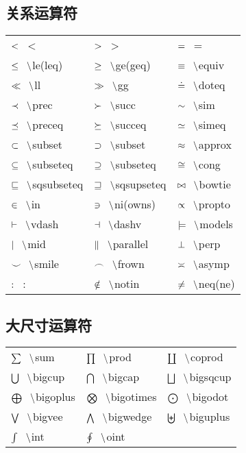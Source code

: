 \documentclass{ctexart}
\newcommand{\pair}[2]{${#1} \hspace{0.3cm} \backslash ${#2}}
\newcommand{\nbpair}[2]{${#1} \hspace{0.3cm} ${#2}} %
\begin{document}
\subsection{关系运算符}
\begin{tabular}{p{4.4cm}p{4.4cm}p{4.4cm}}
    \nbpair{<}{<}                  & \nbpair{>}{>}                  & \nbpair{=}{=}          \\
    \pair{\le}{le(leq)}            & \pair{\ge}{ge(geq)}            & \pair{\equiv}{equiv}   \\
    \pair{\ll}{ll}                 & \pair{\gg}{gg}                 & \pair{\doteq}{doteq}   \\
    \pair{\prec}{prec}             & \pair{\succ}{succ}             & \pair{\sim}{sim}       \\
    \pair{\preceq}{preceq}         & \pair{\succeq}{succeq}         & \pair{\simeq}{simeq}   \\
    \pair{\subset}{subset}         & \pair{\supset}{subset}         & \pair{\approx}{approx} \\
    \pair{\subseteq}{subseteq}     & \pair{\supseteq}{subseteq}     & \pair{\cong}{cong}     \\
    \pair{\sqsubseteq}{sqsubseteq} & \pair{\sqsupseteq}{sqsupseteq} & \pair{\bowtie}{bowtie} \\
    \pair{\in}{in}                 & \pair{\ni}{ni(owns)}           & \pair{\propto}{propto} \\
    \pair{\vdash}{vdash}           & \pair{\dashv}{dashv}           & \pair{\models}{models} \\
    \pair{\mid}{mid}               & \pair{\parallel}{parallel}     & \pair{\perp}{perp}     \\
    \pair{\smile}{smile}           & \pair{\frown}{frown}           & \pair{\asymp}{asymp}   \\
    \nbpair{:}{:}                  & \pair{\notin}{notin}           & \pair{\neq}{neq(ne)}   \\
\end{tabular}

\subsection{大尺寸运算符}

\begin{tabular}{p{4.4cm}p{4.4cm}p{4.4cm}}
    \pair{\sum}{sum}           & \pair{\prod}{prod}           & \pair{\coprod}{coprod}     \\
    \pair{\bigcup}{bigcup}     & \pair{\bigcap}{bigcap}       & \pair{\bigsqcup}{bigsqcup} \\
    \pair{\bigoplus}{bigoplus} & \pair{\bigotimes}{bigotimes} & \pair{\bigodot}{bigodot}   \\
    \pair{\bigvee}{bigvee}     & \pair{\bigwedge}{bigwedge}   & \pair{\biguplus}{biguplus} \\
    \pair{\int}{int}           & \pair{\oint}{oint}           &                            \\
\end{tabular}
\end{document}
